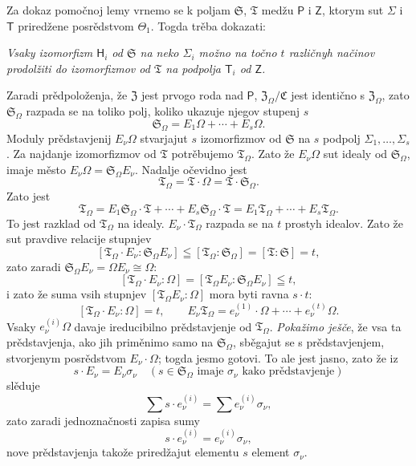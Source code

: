 \documentclass[11pt]{article}
\begin{document}
Za dokaz pomočnoj lemy vrnemo se k poljam \(\mathfrak S\), \(\mathfrak T\) medžu \(\mathsf P\) i \(\mathsf Z\), ktorym sut \(\Sigma\) i \(\mathsf T\) priredžene posrědstvom \(\Theta_1\). Togda trěba dokazati:

\emph{Vsaky izomorfizm \(\mathsf{H}_i\) od \(\mathfrak S\) na neko \(\Sigma_i\) možno na točno \(t\) različnyh načinov prodolžiti do izomorfizmov od \(\mathfrak T\) na podpolja \(\mathsf T_i\) od \(\mathsf Z\).}

Zaradi prědpoloženja, že \(\mathfrak Z\) jest prvogo roda nad \(\mathsf P\), \(\mathfrak Z_\Omega/\mathfrak C\) jest identično s \(\mathfrak Z_\Omega\), zato \(\mathfrak S_\Omega\) razpada se na toliko polj, koliko ukazuje njegov stupenj \(s\)
\[
\mathfrak S_\Omega = E_1\Omega+\cdots+E_s\Omega .
\]
Moduly prědstavjenij \(E_\nu\Omega\) stvarjajut \(s\) izomorfizmov od \(\mathfrak S\) na \(s\) podpolj \(\Sigma_1,\ldots,\Sigma_s\). Za najdanje izomorfizmov od \(\mathfrak T\) potrěbujemo \(\mathfrak T_\Omega\). Zato že \(E_\nu\Omega\) sut idealy od \(\mathfrak S_\Omega\), imaje město \(E_\nu\Omega=\mathfrak S_\Omega E_\nu\). Nadalje očevidno jest
\[
\mathfrak T_\Omega=\mathfrak T\cdot\Omega=\mathfrak T\cdot\mathfrak S_\Omega .
\]
Zato jest
\[
\mathfrak T_\Omega
=E_1\mathfrak S_\Omega\cdot\mathfrak T+\cdots+E_s\mathfrak S_\Omega\cdot\mathfrak T
=E_1\mathfrak T_\Omega+\cdots+E_s\mathfrak T_\Omega .
\]
To jest razklad od \(\mathfrak T_\Omega\) na idealy. \(E_\nu\cdot\mathfrak T_\Omega\) razpada se na \(t\) prostyh idealov. Zato že sut pravdive relacije stupnjev
\[
[\mathfrak T_\Omega\cdot E_\nu:\mathfrak S_\Omega E_\nu]
\leqq [\mathfrak T_\Omega:\mathfrak S_\Omega]=[\mathfrak T:\mathfrak S]=t,
\]
zato zaradi \(\mathfrak S_\Omega E_\nu=\Omega E_\nu\cong\Omega\):
\[
[\mathfrak T_\Omega\cdot E_\nu:\Omega]
=[\mathfrak T_\Omega E_\nu:\mathfrak S_\Omega E_\nu]\leqq t,
\]
i zato že suma vsih stupnjev \([\mathfrak T_\Omega E_\nu:\Omega]\) mora byti ravna \(s\cdot t\):
\[
[\mathfrak T_\Omega\cdot E_\nu:\Omega]=t,\qquad
E_\nu\mathfrak T_\Omega=e_\nu^{(1)}\cdot\Omega+\cdots+e_\nu^{(t)}\Omega .
\]
Vsaky \(e_\nu^{(i)}\Omega\) davaje ireducibilno prědstavjenje od \(\mathfrak T_\Omega\). \emph{Pokažimo ješče}, že vsa ta prědstavjenja, ako jih priměnimo samo na \(\mathfrak S_\Omega\), sběgajut se s prědstavjenjem, stvorjenym posrědstvom \(E_\nu\cdot\Omega\); togda jesmo gotovi. To ale jest jasno, zato že iz
\[
s\cdot E_\nu=E_\nu\sigma_\nu\quad
(s\in\mathfrak S_\Omega\text{ imaje }\sigma_\nu\text{ kako prědstavjenje})
\]
slěduje
\[
\sum s\cdot e_\nu^{(i)}=\sum e_\nu^{(i)}\sigma_\nu,
\]
zato zaradi jednoznačnosti zapisa sumy
\[
s\cdot e_\nu^{(i)}=e_\nu^{(i)}\sigma_\nu,
\]
nove prědstavjenja takože priredžajut elementu \(s\) element \(\sigma_\nu\).
\end{document}
